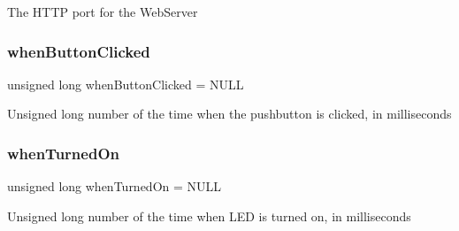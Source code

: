The H\+T\+TP port for the Web\+Server \mbox{\label{test_8ino_afe4223fc496cda29c29b82bbb8f09b48}} 
\subsubsection{\texorpdfstring{whenButtonClicked}{whenButtonClicked}}
{\footnotesize\ttfamily unsigned long when\+Button\+Clicked = N\+U\+LL}

Unsigned long number of the time when the pushbutton is clicked, in milliseconds \mbox{\label{test_8ino_ab7291a0ad43230de4527fd9a0884a286}} 
\subsubsection{\texorpdfstring{whenTurnedOn}{whenTurnedOn}}
{\footnotesize\ttfamily unsigned long when\+Turned\+On = N\+U\+LL}

Unsigned long number of the time when L\+ED is turned on, in milliseconds 